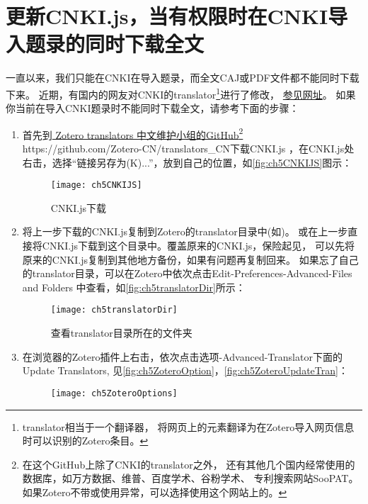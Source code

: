\documentclass[cn,11pt,chinese]{elegantbook}
\begin{document}
		\section{更新CNKI.js，当有权限时在CNKI导入题录的同时下载全文}\label{sec:cnki_fulltext}
				一直以来，我们只能在CNKI在导入题录，而全文CAJ或PDF文件都不能同时下载下来。
				近期，有国内的网友对CNKI的translator\footnote{translator相当于一个翻译器，
				将网页上的元素翻译为在Zotero导入网页信息时可以识别的Zotero条目。}进行了修改，
				\href{https://www.linxingzhong.top/posts/2019-11-5/?tdsourcetag=s_pctim_aiomsg}{参见网址}。
				如果你当前在导入CNKI题录时不能同时下载全文，请参考下面的步骤：
			\begin{enumerate}
				\item\label{it:cnkijs}
					首先到\href{https://github.com/Zotero-CN/translators_CN}{ Zotero translators 
					中文维护小组的GitHub\footnote{在这个GitHub上除了CNKI的translator之外，
					还有其他几个国内经常使用的数据库，如万方数据、维普、百度学术、谷粉学术、
					专利搜索网站SooPAT。如果Zotero不带或使用异常，可以选择使用这个网站上的。} 
					\url{ https://github.com/Zotero-CN/translators_CN}}下载CNKI.js
					，在CNKI.js处右击，选择“链接另存为(K)...”，放到自己的位置，如\autoref{fig:ch5CNKIJS}图示：
					\begin{figure}[htbp]
						\centering
						\texttt{[image: ch5CNKIJS]}
						\caption{CNKI.js下载}
						\label{fig:ch5CNKIJS}
					\end{figure}
				\item
				  将上一步下载的CNKI.js复制到Zotero的translator目录中(如)。
				  或在上一步直接将CNKI.js下载到这个目录中。覆盖原来的CNKI.js，保险起见，
				  可以先将原来的CNKI.js复制到其他地方备份，如果有问题再复制回来。
				  如果忘了自己的translator目录，可以在Zotero中依次点击Edit-Preferences-Advanced-Files and Folders
				  中查看，如\autoref{fig:ch5translatorDir}所示：
					  \begin{figure}[htbp]
					  	\centering
					  	\texttt{[image: ch5translatorDir]}
					  	\caption{查看translator目录所在的文件夹}
					  	\label{fig:ch5translatorDir}
					  \end{figure}
				  \item
				  在浏览器的Zotero插件上右击，依次点击选项-Advanced-Translator下面的Update Translators,
				  见\autoref{fig:ch5ZoteroOption}，\autoref{fig:ch5ZoteroUpdateTran}：
				  \begin{figure}[htbp]
				  	\centering
				  	\texttt{[image: ch5ZoteroOptions]}

\end{figure}
\end{enumerate}
\end{document}
